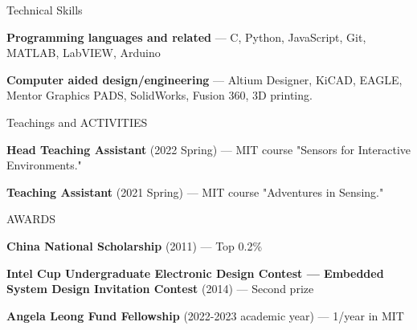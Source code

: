 \documentclass{resume} %
\begin{document}

\begin{rSection}{Technical Skills}

\begin{itemlabel}

\item \textbf{Programming languages and related} --- C, Python, JavaScript, Git, MATLAB, LabVIEW, Arduino

\item \textbf{Computer aided design/engineering} --- Altium Designer, KiCAD, EAGLE, Mentor Graphics PADS, SolidWorks, Fusion 360, 3D printing.

\end{itemlabel}
\end{rSection}

\begin{rSection}{Teachings and ACTIVITIES}

\begin{itemlabel}

\item \textbf{Head Teaching Assistant} (2022 Spring) --- MIT course "Sensors for Interactive Environments."

\item \textbf{Teaching Assistant} (2021 Spring) --- MIT course "Adventures in Sensing."

\end{itemlabel}
\end{rSection}

\begin{rSection}{AWARDS}

\begin{itemlabel}

\item \textbf{China National Scholarship} (2011) --- Top 0.2\%
\item \textbf{Intel Cup Undergraduate Electronic Design Contest --- Embedded System Design Invitation Contest} (2014) --- Second prize
\item \textbf{Angela Leong Fund Fellowship} (2022-2023 academic year) --- 1/year in MIT

\end{itemlabel}
\end{rSection}
\end{document}
